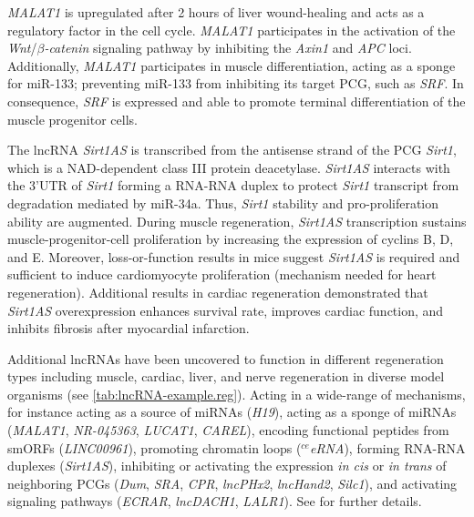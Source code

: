 \textit{MALAT1} is upregulated after 2 hours of liver wound-healing and acts as a regulatory factor in the cell cycle. \textit{MALAT1} participates in the activation of the \textit{Wnt}/$\beta$\textit{-catenin} signaling pathway by inhibiting the \textit{Axin1} and \textit{APC} loci.\autocite{li_2017_malat1} Additionally, \textit{MALAT1} participates in muscle differentiation, acting as a sponge for miR-133; preventing miR-133 from inhibiting its target PCG, such as \textit{SRF}. In consequence, \textit{SRF} is expressed and able to promote terminal differentiation of the muscle progenitor cells.\autocite{han_2015_malat1}

The lncRNA \textit{Sirt1AS} is transcribed from the antisense strand of the PCG \textit{Sirt1}, which is a NAD-dependent class III protein deacetylase. \textit{Sirt1AS} interacts with the 3’UTR of \textit{Sirt1} forming a RNA-RNA duplex to protect \textit{Sirt1} transcript from degradation mediated by miR-34a.\autocite{gonccalves_2017_skeletal,dong_2021_cardiomyocyte} Thus, \textit{Sirt1} stability and pro-proliferation ability are augmented. During muscle regeneration, \textit{Sirt1AS} transcription sustains muscle-progenitor-cell proliferation by increasing the expression of cyclins B, D, and E.\autocite{wang_2016_sirt1,wang_2014_sirt1} Moreover, loss-or-function results in mice suggest \textit{Sirt1AS} is required and sufficient to induce cardiomyocyte proliferation (mechanism needed for heart regeneration). Additional results in cardiac regeneration demonstrated that \textit{Sirt1AS} overexpression enhances survival rate, improves cardiac function, and inhibits fibrosis after myocardial infarction.\autocite{dong_2021_cardiomyocyte}

Additional lncRNAs have been uncovered to function in different regeneration types including muscle, cardiac, liver, and nerve regeneration in diverse model organisms (see \autoref{tab:lncRNA-example.reg}). Acting in a wide-range of mechanisms, for instance acting as a source of miRNAs (\textit{H19}), acting as a sponge of miRNAs (\textit{MALAT1}, \textit{NR-045363}, \textit{LUCAT1}, \textit{CAREL}), encoding functional peptides from smORFs (\textit{LINC00961}), promoting chromatin loops ($^{ce}$\textit{eRNA}), forming RNA-RNA duplexes (\textit{Sirt1AS}), inhibiting or activating the expression \textit{in cis} or \textit{in trans} of neighboring PCGs (\textit{Dum}, \textit{SRA}, \textit{CPR}, \textit{lncPHx2}, \textit{lncHand2}, \textit{Silc1}),  and activating signaling pathways (\textit{ECRAR}, \textit{lncDACH1}, \textit{LALR1}). See \autocite{gonccalves_2017_skeletal,dong_2021_cardiomyocyte,goldman_2020_tissue_regeneration,baghdadi_2018_skeletal,sergeeva_2020_liver_regeneration} for further details.

